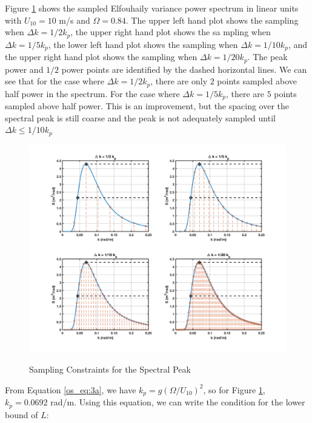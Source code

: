Figure \ref{os_fig:6ba} shows the sampled Elfouhaily variance power spectrum in linear units with $U_{10} = 10$ m/s and $\Omega = 0.84$.  The upper left hand plot shows the sampling when $\Delta k = 1/2 k_p$, the upper right hand plot shows the sa  mpling when $\Delta k = 1/5 k_p$, the lower left hand plot shows the sampling when $\Delta k = 1/10 k_p$, and the upper right hand plot shows the sampling when $\Delta k = 1/20 k_p$. The peak power and $1/2$ power points are identified by the dashed horizontal lines. We can see that for the case where $\Delta k = 1/2 k_p$, there are only $2$ points sampled above half power in the spectrum. For the case where $\Delta k = 1/5 k_p$, there are $5$ points sampled above half power. This is an improvement, but the spacing over the spectral peak is still coarse and the peak is not adequately sampled until $\Delta k \leq 1/10 k_p$

\begin{figure}[ht]
  \begin{center}
\includegraphics[width=6in]{../media/Ocean_Surface/spectral_peak_sampling.png}
  \end{center}
  \renewcommand{\baselinestretch}{1} \small\normalsize
  \begin{quote}
    \caption[Sampling Constraints for the Spectral Peak]{Sampling Constraints for the Spectral Peak\label{os_fig:6ba}}
  \end{quote}
\end{figure}
\renewcommand{\baselinestretch}{2} \small\normalsize

From Equation \ref{os_eq:3a}, we have $k_p = g\left(\Omega/U_{10} \right)^2$, so for Figure \ref{os_fig:6ba}, $k_p = 0.0692$ rad/m. Using this equation, we can write the condition for the lower bound of $L$:

